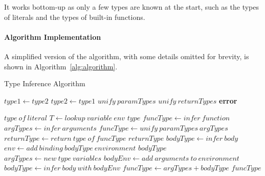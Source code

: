 It works bottom-up as only a few types are known at the start, such as the types of literals and the types of
built-in functions.

\paragraph{Algorithm Implementation}\label{par:algorithm-implementation}
A simplified version of the algorithm, with some details omitted for brevity, is shown in Algorithm~\ref{alg:algorithm}.

\begin{algorithm}
    \caption{Type Inference Algorithm}
    \begin{algorithmic}[1]
                \State $type1 \gets type2$
            \EndIf
                \State $type2 \gets type1$
            \EndIf
                \State $unify\ paramTypes$
                \State $unify\ returnTypes$
            \EndIf
                \State \textbf{error}
            \EndIf
        \EndFunction

                \State \Return $type\ of\ literal$
            \EndIf
                \State $T \gets lookup\ variable\ env$
                \State \Return $type$
            \EndIf
                \State $funcType \gets infer\ function$
                \State $argTypes \gets infer\ arguments$
                \State $funcType \gets unify\ paramTypes\ argTypes$
                \State $returnType \gets return\ type\ of\ funcType$
                \State \Return $returnType$
            \EndIf
                \State $bodyType \gets infer\ body$
                \State $env \gets add\ binding\ bodyType\ environment$
                \State \Return $bodyType$
            \EndIf
                \State $argTypes \gets new\ type\ variables$
                \State $bodyEnv \gets add\ arguments\ to\ environment$
                \State $bodyType \gets infer\ body\ with\ bodyEnv$
                \State $funcType \gets argTypes+bodyType$
                \State \Return $funcType$
            \EndIf
        \EndFunction
    \end{algorithmic}\label{alg:algorithm}
\end{algorithm}


